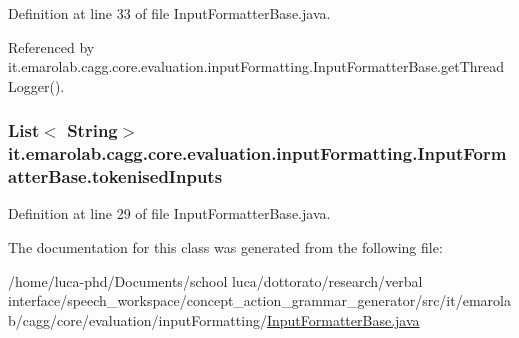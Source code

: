 Definition at line 33 of file Input\-Formatter\-Base.\-java.



Referenced by it.\-emarolab.\-cagg.\-core.\-evaluation.\-input\-Formatting.\-Input\-Formatter\-Base.\-get\-Thread\-Logger().

\hypertarget{classit_1_1emarolab_1_1cagg_1_1core_1_1evaluation_1_1inputFormatting_1_1InputFormatterBase_a65eb65d8bda12ec8dd823e6bc3b04c9a}{
\subsubsection[{tokenised\-Inputs}]{\setlength{\rightskip}{0pt plus 5cm}List$<$ String$>$ it.\-emarolab.\-cagg.\-core.\-evaluation.\-input\-Formatting.\-Input\-Formatter\-Base.\-tokenised\-Inputs\hspace{0.3cm}{\ttfamily [private]}}}\label{classit_1_1emarolab_1_1cagg_1_1core_1_1evaluation_1_1inputFormatting_1_1InputFormatterBase_a65eb65d8bda12ec8dd823e6bc3b04c9a}


Definition at line 29 of file Input\-Formatter\-Base.\-java.



The documentation for this class was generated from the following file\-:\begin{DoxyCompactItemize}
\item 
/home/luca-\/phd/\-Documents/school luca/dottorato/research/verbal interface/speech\-\_\-workspace/concept\-\_\-action\-\_\-grammar\-\_\-generator/src/it/emarolab/cagg/core/evaluation/input\-Formatting/\hyperlink{InputFormatterBase_8java}{Input\-Formatter\-Base.\-java}\end{DoxyCompactItemize}
